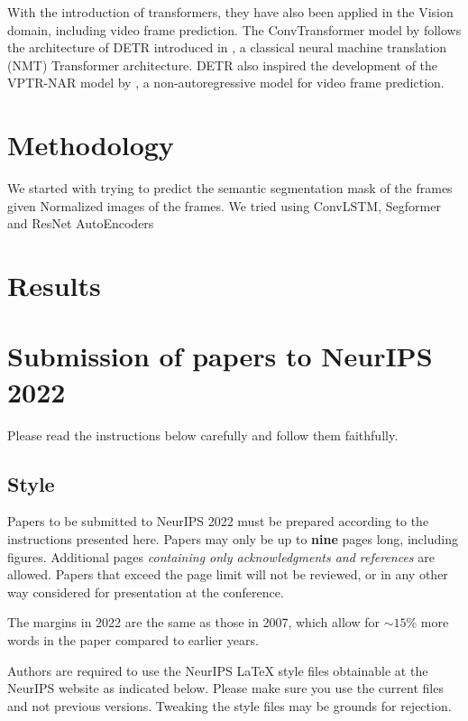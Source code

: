 \documentclass{article}
\begin{document}
With the introduction of transformers, they have also been applied in the Vision domain, 
including video frame prediction. The ConvTransformer model by \citet{Liu2020ConvTransformerAC} 
follows the architecture of DETR introduced in \citet{Meinhardt2021TrackFormerMT}, a classical 
neural machine translation (NMT) Transformer architecture. DETR also inspired the development 
of the VPTR-NAR model by \citet{Ye2022VPTRET}, a non-autoregressive model for video frame 
prediction.


\section{Methodology}
We started with trying to predict the semantic segmentation mask of the frames given Normalized
images of the frames. We tried using ConvLSTM, Segformer and ResNet AutoEncoders

\section{Results}

\section{Submission of papers to NeurIPS 2022}


Please read the instructions below carefully and follow them faithfully.


\subsection{Style}


Papers to be submitted to NeurIPS 2022 must be prepared according to the
instructions presented here. Papers may only be up to {\bf nine} pages long,
including figures. Additional pages \emph{containing only acknowledgments and
references} are allowed. Papers that exceed the page limit will not be
reviewed, or in any other way considered for presentation at the conference.


The margins in 2022 are the same as those in 2007, which allow for $\sim$$15\%$
more words in the paper compared to earlier years.


Authors are required to use the NeurIPS \LaTeX{} style files obtainable at the
NeurIPS website as indicated below. Please make sure you use the current files
and not previous versions. Tweaking the style files may be grounds for
rejection.
\end{document}
